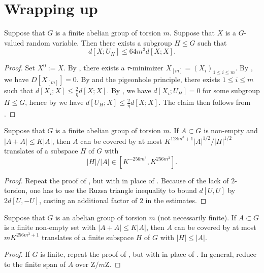 \section{Wrapping up}

\begin{theorem}\label{main-entropy}\leanok Suppose that $G$ is a finite abelian group of torsion $m$.  Suppose that $X$ is a $G$-valued random variable. Then there exists a subgroup $H \leq G$ such that \[ d[X;U_H] \leq 64 m^3 d[X;X].\]
\end{theorem}

\begin{proof}\leanok  Set $X^0 := X$. By , there exists a $\tau$-minimizer $X_{[m]} = (X_i)_{1 \leq i \leq m}$.  By , we have $D[X_{[m]}]=0$. By  and the pigeonhole principle, there exists $1 \leq i \leq m$ such that $d[X_i; X] \leq \frac{2}{\eta} d[X;X]$.  By , we have $d[X_i;U_H]=0$ for some subgroup $H \leq G$, hence by  we have $d[U_H; X] \leq \frac{2}{\eta} d[X;X]$. The claim then follows from .
\end{proof}

\begin{lemma}\label{pfr_aux_torsion}\leanok  Suppose that $G$ is a finite abelian group of torsion $m$.  If $A \subset G$ is non-empty and
  $|A+A| \leq K|A|$, then $A$ can be covered by at most $K ^
  {128m^3+1}|A|^{1/2}/|H|^{1/2}$ translates of a subspace $H$ of $G$ with
  \begin{equation}
    \label{ah2}
    |H|/|A| \in [K^{-256m^3}, K^{256m^3}].
  \end{equation}
  \end{lemma}

\begin{proof}\leanok  Repeat the proof of , but with  in place of .  Because of the lack of $2$-torsion, one has to use the Ruzsa triangle inequality to bound $d[U,U]$ by $2d[U,-U]$, costing an additional factor of $2$ in the estimates.
\end{proof}

\begin{theorem}[PFR]\label{pfr-torsion}\leanok  Suppose that $G$ is an abelian group of torsion $m$ (not necessarily finite).
  If $A \subset G$ is a finite non-empty set with $|A+A| \leq K|A|$, then $A$ can be covered by at most $mK^{256m^3+1}$ translates of a finite subspace $H$ of $G$ with $|H| \leq |A|$.
  \end{theorem}

  \begin{proof}\leanok If $G$ is finite, repeat the proof of , but with  in place of . In general, reduce to the finite span of $A$ over $\mathrm{Z}/m\mathrm{Z}$.
  \end{proof}
